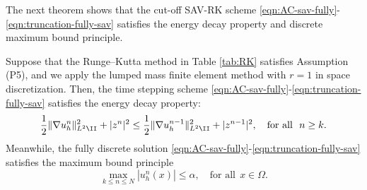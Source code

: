 The next theorem shows that the cut-off SAV-RK scheme \eqref{eqn:AC-sav-fully}-\eqref{eqn:truncation-fully-sav}
satisfies the energy decay property and discrete maximum bound principle.
\begin{theorem}\label{thm:energy-decay}
Suppose that the Runge--Kutta method in Table \ref{tab:RK} satisfies Assumption (P5),
and we apply the  lumped mass
finite element method with $r=1$ in space discretization.
Then, the time stepping scheme \eqref{eqn:AC-sav-fully}-\eqref{eqn:truncation-fully-sav} satisfies the energy decay property:
\begin{equation}\label{eqn:sav-energy}
\frac12\|  \nabla u_h^n \|_{L^2\II}^2 +  |z^{n}|^2 \le \frac12\|  \nabla u_h^{n-1} \|_{L^2\II}^2 +  |z^{n-1}|^2,\quad \text{for all}~~ n\ge k.
\end{equation}
Meanwhile,  the fully discrete solution \eqref{eqn:AC-sav-fully}-\eqref{eqn:truncation-fully-sav} satisfies the maximum bound principle
\begin{equation}\label{eqn:sav-max}
 \max_{k \le n\le N} | u_h^n (x) | \le \alpha, \quad \text{for all}~~ x\in \Omega.
 \end{equation}
\end{theorem}
